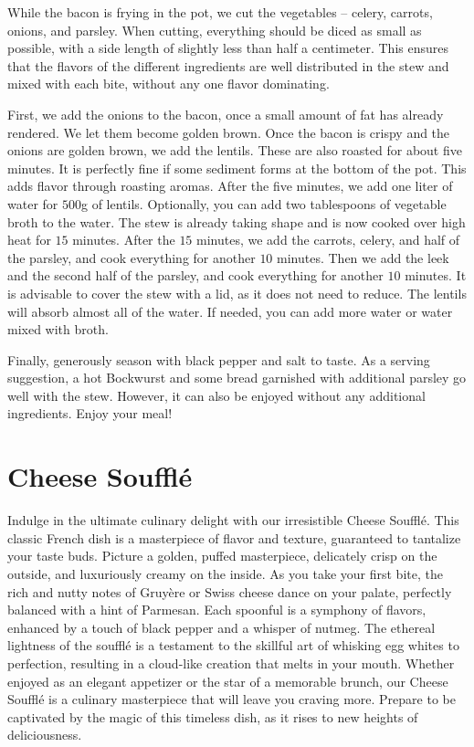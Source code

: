 While the bacon is frying in the pot, we cut the vegetables -- celery, carrots, onions, and parsley. When cutting, everything should be diced as small as possible, with a side length of slightly less than half a centimeter. This ensures that the flavors of the different ingredients are well distributed in the stew and mixed with each bite, without any one flavor dominating.

First, we add the onions to the bacon, once a small amount of fat has already rendered. We let them become golden brown. Once the bacon is crispy and the onions are golden brown, we add the lentils. These are also roasted for about five minutes. It is perfectly fine if some sediment forms at the bottom of the pot. This adds flavor through roasting aromas. After the five minutes, we add one liter of water for $500$g of lentils. Optionally, you can add two tablespoons of vegetable broth to the water. The stew is already taking shape and is now cooked over high heat for $15$ minutes. After the $15$ minutes, we add the carrots, celery, and half of the parsley, and cook everything for another $10$ minutes. Then we add the leek and the second half of the parsley, and cook everything for another $10$ minutes. It is advisable to cover the stew with a lid, as it does not need to reduce. The lentils will absorb almost all of the water. If needed, you can add more water or water mixed with broth.

Finally, generously season with black pepper and salt to taste. As a serving suggestion, a hot Bockwurst and some bread garnished with additional parsley go well with the stew. However, it can also be enjoyed without any additional ingredients. Enjoy your meal!


\section{Cheese Soufflé}
\label{cheesesouffle}
Indulge in the ultimate culinary delight with our irresistible Cheese Soufflé. This classic French dish is a masterpiece of flavor and texture, guaranteed to tantalize your taste buds. Picture a golden, puffed masterpiece, delicately crisp on the outside, and luxuriously creamy on the inside. As you take your first bite, the rich and nutty notes of Gruyère or Swiss cheese dance on your palate, perfectly balanced with a hint of Parmesan. Each spoonful is a symphony of flavors, enhanced by a touch of black pepper and a whisper of nutmeg. The ethereal lightness of the soufflé is a testament to the skillful art of whisking egg whites to perfection, resulting in a cloud-like creation that melts in your mouth. Whether enjoyed as an elegant appetizer or the star of a memorable brunch, our Cheese Soufflé is a culinary masterpiece that will leave you craving more. Prepare to be captivated by the magic of this timeless dish, as it rises to new heights of deliciousness.

